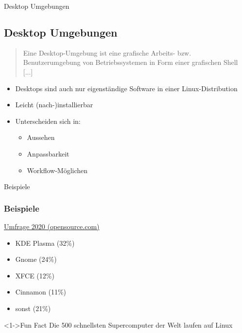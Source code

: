 \begin{frame}{Desktop Umgebungen}
    \subsection{Desktop Umgebungen}\label{subsec:desktop-umgebungen}

    \begin{quote}
        Eine Desktop-Umgebung ist eine grafische Arbeits- bzw. Benutzerumgebung von Betriebssystemen in Form einer grafischen Shell [...]
    \end{quote}

    \pause

    \begin{itemize}
        \item Desktops sind auch nur eigenständige Software in einer Linux-Distribution\pause
        \item Leicht (nach-)installierbar\pause
        \item Unterscheiden sich in:\pause
        \begin{itemize}
            \item Aussehen\pause
            \item Anpassbarkeit\pause
            \item Workflow-Möglichen
        \end{itemize}
    \end{itemize}

\end{frame}

\begin{frame}{Beispiele}
    \subsubsection{Beispiele}\label{subsubsec:beispiele}

    \href{https://opensource.com/article/20/5/linux-desktops}{Umfrage 2020 (opensource.com)}

    \begin{itemize}
        \item<2-> KDE Plasma (32\%)
        \item<3-> Gnome (24\%)
        \item<4-> XFCE (12\%)
        \item<5-> Cinnamon (11\%)
        \item<6-> sonst (21\%)
    \end{itemize}

    \vspace{0.5cm}
    \begin{exampleblock}<1->{Fun Fact}
        Die 500 schnellsten Supercomputer der Welt laufen auf Linux
    \end{exampleblock}

\end{frame}


